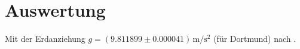\section{Auswertung}
\label{sec:Auswertung}
\FloatBarrier
Mit der Erdanziehung $g=(9.811899 \pm 0.000041) \,\si{\meter\per\square\second}$ (für Dortmund) nach \cite{G}.
